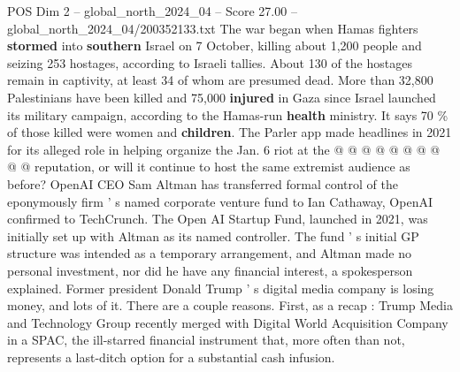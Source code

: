 \begin{textsample}{POS Dim 2 – global\_north\_2024\_04 – Score 27.00 – global\_north\_2024\_04/200352133.txt}
The war began when Hamas fighters \textbf{stormed} into \textbf{southern} Israel on 7 October, killing about 1,200 people and seizing 253 hostages, according to Israeli tallies.
About 130 of the hostages remain in captivity, at least 34 of whom are presumed dead.
More than 32,800 Palestinians have been killed and 75,000 \textbf{injured} in Gaza since Israel launched its military campaign, according to the Hamas-run \textbf{health} ministry.
It says 70 \% of those killed were women and \textbf{children}.
The Parler app made headlines in 2021 for its alleged role in helping organize the Jan. 6 riot at the @ @ @ @ @ @ @ @ @ @ reputation, or will it continue to host the same extremist audience as before?
OpenAI CEO Sam Altman has transferred formal control of the eponymously firm ' s named corporate venture fund to Ian Cathaway, OpenAI confirmed to TechCrunch.
The Open AI Startup Fund, launched in 2021, was initially set up with Altman as its named controller.
The fund ' s initial GP structure was intended as a temporary arrangement, and Altman made no personal investment, nor did he have any financial interest, a spokesperson explained.
Former president Donald Trump ' s digital media company is losing money, and lots of it.
There are a couple reasons.
First, as a recap : Trump Media and Technology Group recently merged with Digital World Acquisition Company in a SPAC, the ill-starred financial instrument that, more often than not, represents a last-ditch option for a substantial cash infusion.

\end{textsample}
